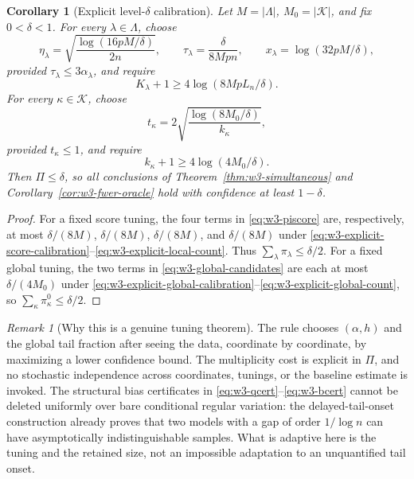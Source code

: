 \documentclass[11pt]{article}
\newtheorem{corollary}[theorem]{Corollary}
\theoremstyle{remark}
\newtheorem{remark}[theorem]{Remark}
\begin{document}
\begin{corollary}[Explicit level-$\delta$ calibration]
\label{cor:w3-explicit-calibration}
Let $M=|\Lambda|$, $M_0=|\mathcal K|$, and fix $0<\delta<1$.  For every
$\lambda\in\Lambda$, choose
\begin{equation}
 \eta_\lambda=
 \sqrt{\frac{\log(16pM/\delta)}{2n}},
 \qquad
 \tau_\lambda=\frac{\delta}{8Mpn},
 \qquad
 x_\lambda=\log(32pM/\delta),
 \label{eq:w3-explicit-score-calibration}
\end{equation}
provided $\tau_\lambda\le3\alpha_\lambda$, and require
\begin{equation}
 K_\lambda+1\ge4\log(8MpL_n/\delta).
 \label{eq:w3-explicit-local-count}
\end{equation}
For every $\kappa\in\mathcal K$, choose
\begin{equation}
 t_\kappa=2\sqrt{\frac{\log(8M_0/\delta)}{k_\kappa}},
 \label{eq:w3-explicit-global-calibration}
\end{equation}
provided $t_\kappa\le1$, and require
\begin{equation}
 k_\kappa+1\ge4\log(4M_0/\delta).
 \label{eq:w3-explicit-global-count}
\end{equation}
Then $\Pi\le\delta$, so all conclusions of
Theorem~\ref{thm:w3-simultaneous} and
Corollary~\ref{cor:w3-fwer-oracle} hold with confidence at least $1-\delta$.
\end{corollary}

\begin{proof}
For a fixed score tuning, the four terms in \eqref{eq:w3-piscore} are,
respectively, at most
$\delta/(8M)$, $\delta/(8M)$, $\delta/(8M)$, and $\delta/(8M)$ under
\eqref{eq:w3-explicit-score-calibration}--\eqref{eq:w3-explicit-local-count}.
Thus $\sum_{\lambda}\pi_\lambda\le\delta/2$.  For a fixed global tuning,
the two terms in \eqref{eq:w3-global-candidates} are each at most
$\delta/(4M_0)$ under
\eqref{eq:w3-explicit-global-calibration}--\eqref{eq:w3-explicit-global-count},
so $\sum_\kappa\pi_\kappa^0\le\delta/2$.
\end{proof}

\begin{remark}[Why this is a genuine tuning theorem]
The rule chooses $(\alpha,h)$ and the global tail fraction after seeing the
data, coordinate by coordinate, by maximizing a lower confidence bound.  The
multiplicity cost is explicit in $\Pi$, and no stochastic independence across
coordinates, tunings, or the baseline estimate is invoked.  The structural
bias certificates in \eqref{eq:w3-qcert}--\eqref{eq:w3-bcert} cannot be deleted
uniformly over bare conditional regular variation: the delayed-tail-onset
construction already proves that two models with a gap of order $1/\log n$
can have asymptotically indistinguishable samples.  What is adaptive here is
the tuning and the retained size, not an impossible adaptation to an
unquantified tail onset.
\end{remark}
\end{document}
